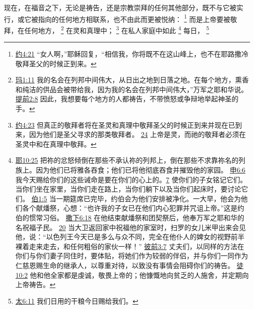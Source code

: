 \documentclass[12pt, a4paper, oneside]{ctexart}
\newcounter{parnum}[section]
\newcommand{\N}{%
   \noindent\refstepcounter{parnum}%
    \makebox[\parindent][l]{\textbf{\arabic{parnum}.}}}
\begin{document}
\N 现在，在福音之下，无论是祷告，还是宗教崇拜的任何其他部分，既不与它被实行，或它被指向的任何地方相联系，也不由此而更被悦纳：
	\footnote {
		\href{https://biblehub.com/john/4-21.htm}{约4:21} “女人啊，”耶稣回复，“相信我，你将既不在这山峰上，也不在耶路撒冷敬拜圣父的时候正到来。
	}
	而是上帝要被敬拜，在任何地方，
	\footnote {
		\href{https://biblehub.com/malachi/1-11.htm}{玛1:11} 我的名会在列邦中间伟大，从日出之地到日落之地。在每个地方，熏香和纯洁的供品会被带给我，因为我的名会在列邦中间伟大，”万军之耶和华说。
		\href{https://biblehub.com/1_timothy/2-8.htm}{提前2:8} 因此，我想要每个地方的人都祷告，不带愤怒或争辩地举起神圣的手。
	}
	在灵和真理中；
	\footnote {
		\href{https://biblehub.com/john/4-23.htm}{约4:23} 但真正的敬拜者将在圣灵和真理中敬拜圣父的时候正到来并现在已到来，因为他们是圣父寻求的那类敬拜者。
		\href{https://biblehub.com/john/4-24.htm}{24} 上帝是灵，而祂的敬拜者必须在圣灵中和在真理中敬拜。
	}
	在私人家庭中如此
	\footnote {
		\href{https://biblehub.com/jeremiah/10-25.htm}{耶10:25} 把祢的忿怒倾倒在那些不承认祢的列邦上，倒在那些不求靠祢名的列族上。因为他们已将雅各吞食；他们已将他彻底吞食并摧毁他的家园。
		\href{https://biblehub.com/deuteronomy/6-6.htm}{申6:6} 我今天赐给你们的这些诫命是要在你们的心上的。\href{https://biblehub.com/deuteronomy/6-7.htm}{7} 使你们的子女铭记它们。当你们坐在家里，当你们走在路上，当你们躺下以及当你们起床时，要讨论它们。
		\href{https://biblehub.com/job/1-5.htm}{伯1:5} 当一期筵席已完毕，约伯会为他们安排被净化。一大早，他会为他们各个献燔祭，心想：“也许我的子女已在他们内心犯罪并咒诅上帝。”这是约伯的惯常习俗。
		\href{https://biblehub.com/2_samuel/6-18.htm}{撒下6:18} 在他结束献燔祭和团契祭后，他奉万军之耶和华的名祝福子民。
		\href{https://biblehub.com/2_samuel/6-20.htm}{20} 当大卫返回家中祝福他的家室时，扫罗的女儿米甲出来会见他，说：“以色列王今天已是多么与众不同，完全在他仆人的婢女的视野前半裸着走来走去，和任何粗俗的家伙一样！”
		\href{https://biblehub.com/1_peter/3-7.htm}{彼前3:7} 丈夫们，以同样的方法在你们与你们妻子同住时，要体贴，将她们作为较弱的伴侣，并与你们一同作为仁慈恩赐生命的继承人，以尊重对待，以致没有事情会阻碍你们的祷告。
		\href{https://biblehub.com/acts/10-2.htm}{徒10:2} 他和他全家都是虔诚，敬畏上帝的；他慷慨地向贫乏的人施舍，并定期向上帝祷告。
	}
	每日，
	\footnote {
		\href{https://biblehub.com/matthew/6-11.htm}{太6:11} 我们日用的干粮今日赐给我们。
	}
\end{document}
